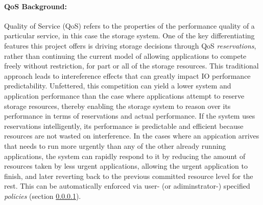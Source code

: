 \paragraph{QoS Background:} 
Quality of Service (QoS) refers to the
properties of the performance quality of a particular service, in
this case the storage system.
One of the key differentiating features this project offers is driving storage
decisions through QoS \emph{reservations}, rather than continuing the current model
of allowing applications to compete freely without restriction, for part or all of the storage
resources. This traditional approach leads to intereference effects
\cite{lofstead:2010:io-variability,liu_hotstorage} that can greatly impact IO performance predictability. 
Unfettered, this competition can yield a lower system and application performance 
than the case where applications attempt to reserve storage resources, thereby enabling the storage system
to reason over its performance in terms of reservations and actual
performance.
If the system uses reservations intelligently, its performance is predictable and
efficient because resources are not wasted on interference.
In the cases where an appication arrives that needs to run more urgently
than any of the other already running applications, the system
can rapidly respond to it by reducing the amount of resources taken 
by less urgent applications, allowing the urgent application to finish,
and later reverting back to the previous committed resource level for the rest. This can
be automatically enforced via user- (or adiminstrator-) specified \textit{policies}
(section \ref{}).

